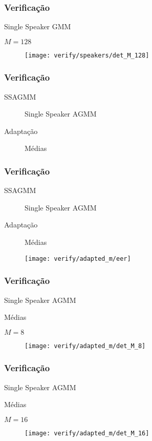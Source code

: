 \begin{frame}
\frametitle{Verificação}
\begin{description}
    \item[SSGMM] Single Speaker GMM
    \item $M = 128$
\end{description}

\begin{figure}[ht]
    \centering
    \texttt{[image: verify/speakers/det\_M\_128]}
\end{figure}
\end{frame}

\begin{frame}
\frametitle{Verificação}
\begin{description}
    \item[SSAGMM] Single Speaker AGMM
    \item[Adaptação] Médias
\end{description}


\end{frame}

\begin{frame}
\frametitle{Verificação}
\begin{description}
    \item[SSAGMM] Single Speaker AGMM
    \item[Adaptação] Médias
\end{description}

\begin{figure}[ht]
    \centering
    \texttt{[image: verify/adapted\_m/eer]}
\end{figure}
\end{frame}

\begin{frame}
\frametitle{Verificação}
\begin{description}
    \item[SSAGMM] Single Speaker AGMM
    \item[Adaptação] Médias
    \item $M = 8$
\end{description}

\begin{figure}[ht]
    \centering
    \texttt{[image: verify/adapted\_m/det\_M\_8]}
\end{figure}
\end{frame}

\begin{frame}
\frametitle{Verificação}
\begin{description}
    \item[SSAGMM] Single Speaker AGMM
    \item[Adaptação] Médias
    \item $M = 16$
\end{description}

\begin{figure}[ht]
    \centering
    \texttt{[image: verify/adapted\_m/det\_M\_16]}
\end{figure}
\end{frame}

